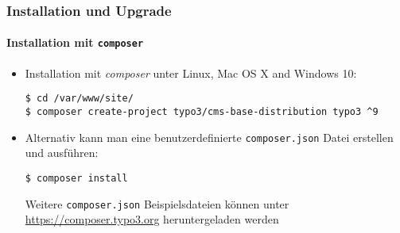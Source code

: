 
\begin{frame}[fragile]
	\frametitle{Installation und Upgrade}
	\framesubtitle{Installation mit \texttt{composer}}

	\begin{itemize}
		\item Installation mit \textit{composer} unter Linux, Mac OS X and Windows 10:

\begin{lstlisting}
$ cd /var/www/site/
$ composer create-project typo3/cms-base-distribution typo3 ^9
\end{lstlisting}

		\item Alternativ kann man eine benutzerdefinierte \texttt{composer.json} Datei erstellen und ausführen:

\begin{lstlisting}
$ composer install
\end{lstlisting}

			Weitere \texttt{composer.json} Beispielsdateien können unter \newline
			\smaller
				\href{https://composer.typo3.org}{https://composer.typo3.org} heruntergeladen werden
			\normalsize

	\end{itemize}
\end{frame}


